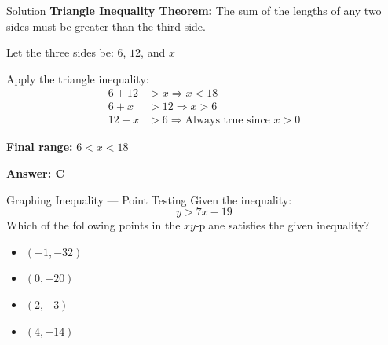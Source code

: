 \documentclass{beamer}
\begin{document}
\begin{frame}{Solution}
\small
\textbf{Triangle Inequality Theorem:} The sum of the lengths of any two sides must be greater than the third side.

Let the three sides be: $6$, $12$, and $x$

Apply the triangle inequality:
\begin{align*}
6 + 12 &> x \Rightarrow x < 18 \\
6 + x &> 12 \Rightarrow x > 6 \\
12 + x &> 6 \Rightarrow \text{Always true since } x > 0
\end{align*}

\textbf{Final range:} $6 < x < 18$

\textbf{Answer: C}
\end{frame}



\begin{frame}
\end{frame}



\begin{frame}{Graphing Inequality — Point Testing}
    Given the inequality:
    \[
    y > 7x - 19
    \]
    Which of the following points in the \(xy\)-plane satisfies the given inequality?

    \vspace{1em}
    \begin{itemize}
        \item[\textbf{A.}] \((-1, -32)\)
        \item[\textbf{B.}] \((0, -20)\)
        \item[\textbf{C.}] \((2, -3)\)
        \item[\textbf{D.}] \((4, -14)\)
    \end{itemize}
\end{frame}
\end{document}
